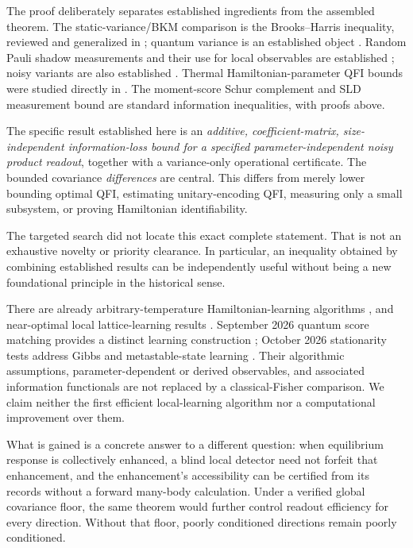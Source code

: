 \documentclass[11pt,a4paper]{article}
\theoremstyle{remark}
\begin{document}
The proof deliberately separates established ingredients from the assembled theorem. The static-variance/BKM comparison is the Brooks--Harris inequality, reviewed and generalized in \cite{BrankovTonchev}; quantum variance is an established object \cite{FrerotRoscilde}. Random Pauli shadow measurements and their use for local observables are established \cite{HKP}; noisy variants are also established \cite{KohGrewal}. Thermal Hamiltonian-parameter QFI bounds were studied directly in \cite{GarciaPintos}. The moment-score Schur complement and SLD measurement bound are standard information inequalities, with proofs above.

The specific result established here is an \emph{additive, coefficient-matrix, size-independent information-loss bound for a specified parameter-independent noisy product readout}, together with a variance-only operational certificate. The bounded covariance \emph{differences} are central. This differs from merely lower bounding optimal QFI, estimating unitary-encoding QFI, measuring only a small subsystem, or proving Hamiltonian identifiability.

The targeted search did not locate this exact complete statement. That is not an exhaustive novelty or priority clearance. In particular, an inequality obtained by combining established results can be independently useful without being a new foundational principle in the historical sense.

There are already arbitrary-temperature Hamiltonian-learning algorithms \cite{BLMT}, and near-optimal local lattice-learning results \cite{CAN}. September 2026 quantum score matching provides a distinct learning construction \cite{DongLeng}; October 2026 stationarity tests address Gibbs and metastable-state learning \cite{Bergamaschi}. Their algorithmic assumptions, parameter-dependent or derived observables, and associated information functionals are not replaced by a classical-Fisher comparison. We claim neither the first efficient local-learning algorithm nor a computational improvement over them.

What is gained is a concrete answer to a different question: when equilibrium response is collectively enhanced, a blind local detector need not forfeit that enhancement, and the enhancement's accessibility can be certified from its records without a forward many-body calculation. Under a verified global covariance floor, the same theorem would further control readout efficiency for every direction. Without that floor, poorly conditioned directions remain poorly conditioned.
\end{document}
